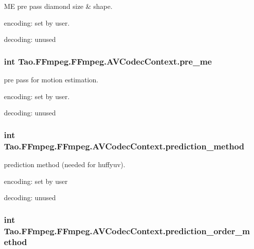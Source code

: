 \label{struct_tao_1_1_f_fmpeg_1_1_f_fmpeg_1_1_a_v_codec_context_a19b5a2c34c4965c984a46922e046e80a}
ME pre pass diamond size \& shape.
\begin{DoxyItemize}
\item encoding: set by user.
\item decoding: unused 
\end{DoxyItemize}\hypertarget{struct_tao_1_1_f_fmpeg_1_1_f_fmpeg_1_1_a_v_codec_context_a3893cd1161ba3a77788203ebeee94e12}{
\subsubsection[{pre\_\-me}]{\setlength{\rightskip}{0pt plus 5cm}int {\bf Tao.FFmpeg.FFmpeg.AVCodecContext.pre\_\-me}}}
\label{struct_tao_1_1_f_fmpeg_1_1_f_fmpeg_1_1_a_v_codec_context_a3893cd1161ba3a77788203ebeee94e12}
pre pass for motion estimation.
\begin{DoxyItemize}
\item encoding: set by user.
\item decoding: unused 
\end{DoxyItemize}\hypertarget{struct_tao_1_1_f_fmpeg_1_1_f_fmpeg_1_1_a_v_codec_context_a40fb9763ea05edec432dcac84c3cb6a1}{
\subsubsection[{prediction\_\-method}]{\setlength{\rightskip}{0pt plus 5cm}int {\bf Tao.FFmpeg.FFmpeg.AVCodecContext.prediction\_\-method}}}
\label{struct_tao_1_1_f_fmpeg_1_1_f_fmpeg_1_1_a_v_codec_context_a40fb9763ea05edec432dcac84c3cb6a1}
prediction method (needed for huffyuv).
\begin{DoxyItemize}
\item encoding: set by user
\item decoding: unused 
\end{DoxyItemize}\hypertarget{struct_tao_1_1_f_fmpeg_1_1_f_fmpeg_1_1_a_v_codec_context_aff9132cb106ba32c1939271160790d08}{
\subsubsection[{prediction\_\-order\_\-method}]{\setlength{\rightskip}{0pt plus 5cm}int {\bf Tao.FFmpeg.FFmpeg.AVCodecContext.prediction\_\-order\_\-method}}}
